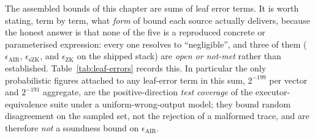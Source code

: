 The assembled bounds of this chapter are sums of leaf error terms. It is worth stating, term by term,
what \emph{form} of bound each source actually delivers, because the honest answer is that none of the
five is a reproduced concrete or parameterised expression: every one resolves to ``negligible'', and
three of them (\(\epsilon_{\mathrm{AIR}}\), \(\epsilon_{\mathrm{sZK}}\), and \(\epsilon_{\mathrm{ZK}}\)
on the shipped stack) are \emph{open or not-met} rather than established. Table~\ref{tab:leaf-errors}
records this. In particular the only probabilistic figures attached to any leaf-error term in this sum,
\(2^{-199}\) per vector and \(2^{-191}\) aggregate, are the positive-direction \emph{test coverage} of
the executor-equivalence suite under a uniform-wrong-output model; they bound random disagreement on the
sampled set, not the rejection of a malformed trace, and are therefore \emph{not} a soundness bound on
\(\epsilon_{\mathrm{AIR}}\).

